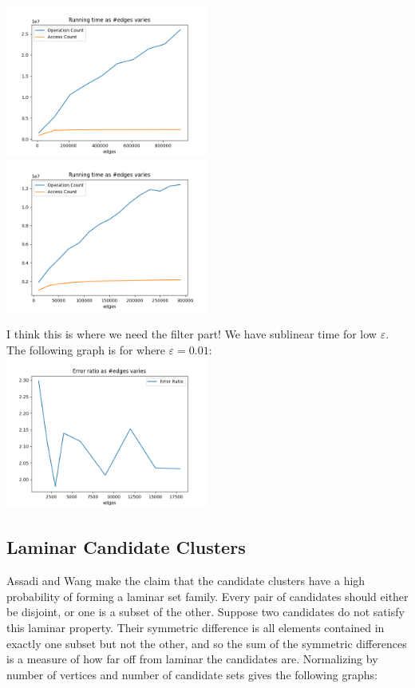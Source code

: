\documentclass[
]{article}
\begin{document}
\includegraphics[width=0.5\textwidth]{images/running_time_as_edges_varies.png}
\includegraphics[width=0.5\textwidth]{images/running_time_as_edges_varies_word_vector.png}

I think this is where we need the filter part! We have sublinear time
for low {\(\varepsilon\)}. The following graph is for where
  {\(\varepsilon = 0.01\)}:\\
\includegraphics[width=0.5\textwidth]{images/error_ratio_as_edges_varies_low_epsilon.png}

\hypertarget{laminar-candidate-clusters}{%
  \subsection{Laminar Candidate
    Clusters}\label{laminar-candidate-clusters}}

Assadi and Wang make the claim that the candidate clusters have a high
probability of forming a laminar set family. Every pair of candidates
should either be disjoint, or one is a subset of the other. Suppose two
candidates do not satisfy this laminar property. Their symmetric
difference is all elements contained in exactly one subset but not the
other, and so the sum of the symmetric differences is a measure of how
far off from laminar the candidates are. Normalizing by number of
vertices and number of candidate sets gives the following graphs:
\end{document}
